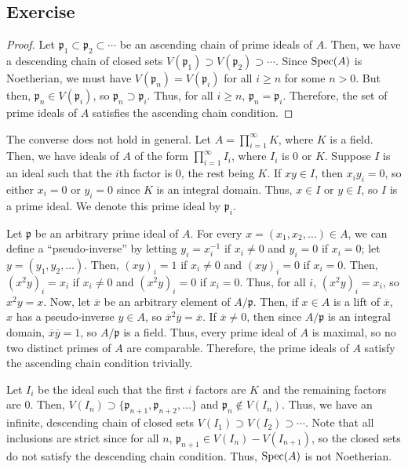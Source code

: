 \subsection{Exercise}\label{6.12}

\begin{proof}
Let $\mathfrak{p}_1 \subset \mathfrak{p}_2 \subset \cdots$ be an ascending chain of prime ideals of $A$. Then, we have a descending chain of closed
sets $V(\mathfrak{p}_1) \supset V(\mathfrak{p}_2) \supset \cdots$. Since $\operatorname{Spec}(A)$ is Noetherian, we must have $V(\mathfrak{p}_n) = V(\mathfrak{p}_i)$
for all $i \ge n$ for some $n > 0$. But then, $\mathfrak{p}_n \in V(\mathfrak{p}_i)$, so $\mathfrak{p}_n \supset \mathfrak{p}_i$. Thus, for all
$i \ge n$, $\mathfrak{p}_n = \mathfrak{p}_i$. Therefore, the set of prime ideals of $A$ satisfies the ascending chain condition.
\end{proof}

The converse does not hold in general. Let $A = \prod_{i=1}^{\infty} K$, where $K$ is a field. Then, we have ideals of $A$ of the form $\prod_{i=1}^{\infty} I_i$, 
where $I_i$ is $0$ or $K$. Suppose $I$ is an ideal such that the $i$th factor is $0$, the rest being $K$. If $xy \in I$, then $x_i y_i = 0$, so either $x_i = 0$ or 
$y_i = 0$ since $K$ is an integral domain. Thus, $x \in I$ or $y \in I$, so $I$ is a prime ideal. We denote this prime ideal by $\mathfrak{p}_i$.

Let $\mathfrak{p}$ be an arbitrary prime ideal of $A$. For every $x = (x_1,x_2,\ldots) \in A$, we can define a ``pseudo-inverse'' by letting $y_i = x_i^{-1}$
if $x_i \neq 0$ and $y_i = 0$ if $x_i = 0$; let $y = (y_1,y_2,\ldots)$. Then, $(xy)_i = 1$ if $x_i \neq 0$ and $(xy)_i = 0$ if $x_i = 0$. Then, 
$(x^2y)_i = x_i$ if $x_i \neq 0$ and $(x^2y)_i = 0$ if $x_i = 0$. Thus, for all $i$, $(x^2y)_i = x_i$, so $x^2 y = x$. Now, let $\overline{x}$ be
an arbitrary element of $A/\mathfrak{p}$. Then, if $x \in A$ is a lift of $\overline{x}$, $x$ has a pseudo-inverse $y \in A$, so 
$\overline{x}^2\overline{y} = \overline{x}$. If $\overline{x} \neq 0$, then since $A/\mathfrak{p}$ is an integral domain, $\overline{x}\overline{y} = 1$,
so $A/\mathfrak{p}$ is a field. Thus, every prime ideal of $A$ is maximal, so no two distinct primes of $A$ are comparable. Therefore, the prime
ideals of $A$ satisfy the ascending chain condition trivially.

Let $I_i$ be the ideal such that the first $i$ factors are $K$ and the remaining factors are $0$. Then, $V(I_n) \supset \{\mathfrak{p}_{n+1},\mathfrak{p}_{n+2},\ldots\}$
and $\mathfrak{p}_n \not\in V(I_n)$. Thus, we have an infinite, descending chain of closed sets $V(I_1) \supset V(I_2) \supset \cdots$. Note that all inclusions are strict 
since for all $n$, $\mathfrak{p}_{n+1} \in V(I_n) - V(I_{n+1})$, so the closed sets do not satisfy the descending chain condition. Thus, $\operatorname{Spec}(A)$ is not Noetherian.

